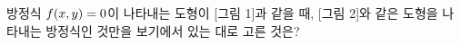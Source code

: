 방정식 $f(x{,}\mkern3mu\mathopen{}y)=0$이 나타내는 도형이 [그림 1]과 같을 때, [그림 2]와 같은 도형을 나타내는 방정식인 것만을 보기에서 있는 대로 고른 것은?
\par\smallskip\begin{center}\resizebox{\ifdim\width>\linewidth\linewidth\else\width\fi}{!}{}\end{center}
\noindent {}
